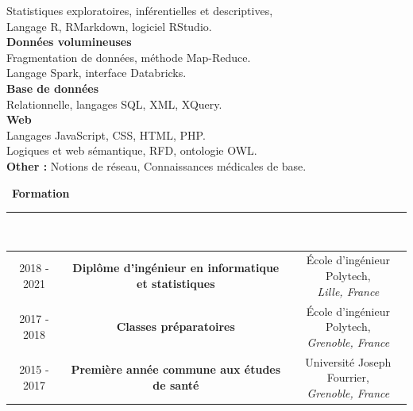 \documentclass[a4paper]{article}
\begin{document}
\begin{titlepage}
\begin{multicols}{2}
Statistiques exploratoires, inf\'{e}rentielles et descriptives,\\
Langage R, RMarkdown, logiciel RStudio.\\[0.2cm]
\textbf{Donn\'{e}es volumineuses}\\
Fragmentation de donn\'{e}es, m\'{e}thode Map-Reduce.\\
Langage Spark, interface Databricks.\\[0.2cm]
\textbf{Base de donn\'{e}es}\\
Relationnelle, langages SQL, XML, XQuery.\\[0.2cm]
\textbf{Web}\\
Langages JavaScript, CSS, HTML, PHP.\\
Logiques et web s\'{e}mantique, RFD, ontologie OWL.\\[0.2cm]
\textbf{Other :} Notions de r\'{e}seau, Connaissances m\'{e}dicales de base.
\end{multicols}

\medskip

\mbox{\Large \comfortaa \textbf{ \faGraduationCap \hspace{0.2cm} Formation}}\\
\rule{0.8\linewidth}{0.01mm}\\[0.2cm]
\begin{tabular}{ccc}
\parbox[]{0.11\linewidth}{2018 - 2021\\} 
&
\parbox[]{0.59\linewidth}{\large \textbf{Dipl\^{o}me d'ing\'{e}nieur en informatique et statistiques\\}}
&
\parbox[]{0.3\linewidth}{\'{E}cole d'ing\'{e}nieur Polytech,\\ \textit{Lille, France}\\}

\\

\parbox[]{0.11\linewidth}{2017 - 2018\\} 
&
\parbox[]{0.59\linewidth}{\large \textbf{Classes pr\'{e}paratoires}\\}
&
\parbox[]{0.3\linewidth}{\'{E}cole d'ing\'{e}nieur Polytech,\\ \textit{Grenoble, France}\\}

\\

\parbox[]{0.11\linewidth}{2015 - 2017\\} 
&
\parbox[]{0.59\linewidth}{\large \textbf{Premi\`{e}re ann\'{e}e commune aux \'{e}tudes de sant\'{e}}\\}
&
\parbox[]{0.3\linewidth}{Universit\'{e} Joseph Fourrier,\\ \textit{Grenoble, France}\\}
\end{tabular}


\end{titlepage}
\end{document}
